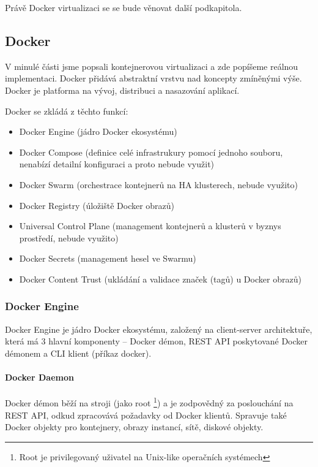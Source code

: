 \documentclass[thesis=M,czech]{FITthesis}[2019/12/23]
\theoremstyle{plain}
\theoremstyle{definition}
\begin{document}
 Právě Docker virtualizaci se se bude věnovat další podkapitola.

\subsection{Docker}

V minulé části jsme popsali kontejnerovou virtualizaci a zde popíšeme reálnou implementaci. Docker přidává abstraktní vrstvu nad koncepty zmíněnými výše. Docker je platforma na vývoj, distribuci a nasazování aplikací. 

Docker se zkládá z těchto funkcí:


\begin{itemize}  
\item Docker Engine (jádro Docker ekosystému)
\item Docker Compose (definice celé infrastrukury pomocí jednoho souboru, nenabízí detailní konfiguraci a proto nebude využit)
\item Docker Swarm (orchestrace kontejnerů na HA klusterech, nebude využito)
\item Docker Registry (úložiště Docker obrazů)
\item Universal Control Plane (management kontejnerů a klusterů v byznys prostředí, nebude využito)
\item Docker Secrets (management hesel ve Swarmu)
\item Docker Content Trust (ukládání a validace značek (tagů) u Docker obrazů)

\end{itemize}


\subsubsection{Docker Engine}

Docker Engine je jádro Docker ekosystému, založený na client-server architektuře, která má 3 hlavní komponenty -- Docker démon, REST API poskytované Docker démonem a CLI klient (příkaz docker).




\paragraph{Docker Daemon}

Docker démon běží na stroji (jako root \footnote{Root je privilegovaný uživatel na Unix-like operačních systémech}) a je zodpovědný za poslouchání na REST API, odkud zpracovává požadavky od Docker klientů. Spravuje také Docker objekty pro kontejnery, obrazy instancí, sítě, diskové objekty.
\end{document}
